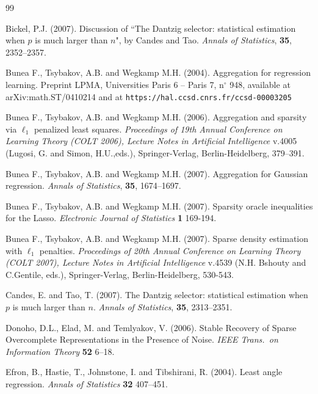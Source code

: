 \documentclass[dvips,aos]{imsart}
\numberwithin{equation}{section}
\theoremstyle{plain}
\begin{document}
\begin{thebibliography}{99}

 {\sc Bickel, P.J.} (2007). Discussion of ``The Dantzig
    selector: statistical estimation when $p$ is much larger than $n$", by
    Candes and Tao. {\it Annals of Statistics}, \textbf{35}, 2352--2357.


{\sc Bunea F., Tsybakov, A.B.} and {\sc Wegkamp M.H.} (2004).
Aggregation for regression learning. Preprint LPMA, Universities
Paris 6 -- Paris 7, n$^\circ$ 948, available at
arXiv:math.ST/0410214 and at
\texttt{https://hal.ccsd.cnrs.fr/ccsd-00003205}


{\sc Bunea F., Tsybakov, A.B.} and {\sc Wegkamp M.H.} (2006).
Aggregation and sparsity via $\ell_1$ penalized least squares. {\it
Proceedings of 19th Annual Conference on Learning Theory (COLT
2006), Lecture Notes in Artificial Intelligence} v.4005 (Lugosi, G.
and Simon, H.U.,eds.), Springer-Verlag, Berlin-Heidelberg, 379--391.

{\sc Bunea F., Tsybakov, A.B.} and {\sc Wegkamp M.H.} (2007).
Aggregation for Gaussian regression. {\it Annals of Statistics}, \textbf{35}, 1674--1697.


{\sc Bunea F., Tsybakov, A.B.} and {\sc Wegkamp M.H.} (2007).
Sparsity oracle inequalities for the Lasso. {\it Electronic Journal
of Statistics} {\bf 1} 169-194.

{\sc Bunea F., Tsybakov, A.B.} and {\sc Wegkamp M.H.} (2007). Sparse
density estimation with $\ell_1$ penalties. {\it Proceedings of 20th
Annual Conference on Learning Theory (COLT 2007), Lecture Notes in
Artificial Intelligence} v.4539 (N.H. Bshouty and C.Gentile, eds.),
Springer-Verlag, Berlin-Heidelberg, 530-543.



 {\sc Candes, E.} and  {\sc Tao, T.} (2007). The Dantzig
    selector: statistical estimation when $p$ is much larger than $n$. {\it
    Annals of Statistics}, \textbf{35}, 2313--2351.


 {\sc Donoho, D.L., Elad, M.} and {\sc Temlyakov, V.} (2006).
 Stable Recovery of Sparse Overcomplete Representations in the Presence of
 Noise. {\it IEEE
Trans.\ on Information Theory} {\bf 52}  6--18.

 {\sc Efron, B., Hastie, T., Johnstone, I.} and
{\sc Tibshirani, R.} (2004). Least angle regression. {\em Annals of
Statistics} \textbf{32} 407--451.



\end{thebibliography}
\end{document}
